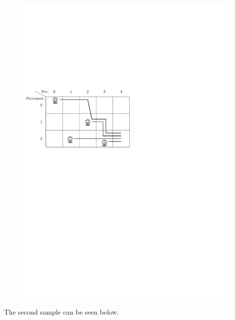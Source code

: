 \begin{figure}
\begin{center}
  \includegraphics{sample-small}
\end{center}
\end{figure}
\vspace{1em}

The second sample can be seen below.

\vspace{1em}

